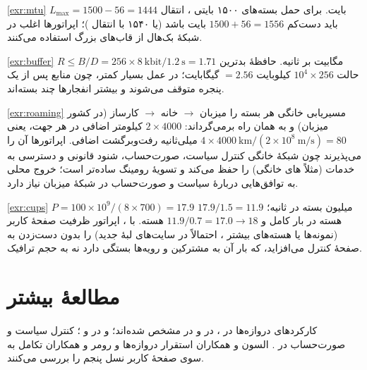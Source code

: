 \documentclass[11pt,a4paper]{article}
\begin{document}
\begin{solutionbox}{\ref{exr:mtu}}
$L_{\max} = 1500 - 56 = 1444$ بایت. برای حمل بسته‌های ۱۵۰۰ بایتی ،  انتقال باید دست‌کم
$1500 + 56 = 1556$ بایت باشد (یا ۱۵۴۰ با انتقال )؛ اپراتورها اغلب در شبکهٔ بک‌هال از قاب‌های بزرگ استفاده
می‌کنند.
\end{solutionbox}

\begin{solutionbox}{\ref{exr:buffer}}
$R \le B/D = 256\times8\ \text{kbit}/1.2\ \text{s} = 1.71$ مگابیت بر ثانیه. حافظهٔ بدترین حالت $10^4\times256$ کیلوبایت
$= 2.56$ گیگابایت؛ در عمل بسیار کمتر، چون منابع  پس از یک پنجره متوقف می‌شوند و بیشتر انفجارها چند بسته‌اند.
\end{solutionbox}

\begin{solutionbox}{\ref{exr:roaming}}
مسیریابی خانگی هر بسته را میزبان $\to$ خانه $\to$ کارساز (در کشور میزبان) و به همان راه برمی‌گرداند: $2\times4000$ کیلومتر
اضافی در هر جهت، یعنی $4\times4000\ \text{km}/(2\times10^8\ \text{m/s}) = 80$ میلی‌ثانیه رفت‌وبرگشت اضافی. اپراتورها آن را
می‌پذیرند چون شبکهٔ خانگی کنترل سیاست، صورت‌حساب، شنود قانونی و دسترسی به خدمات (مثلاً های خانگی) را حفظ
می‌کند و تسویهٔ رومینگ ساده‌تر است؛ خروج محلی به توافق‌هایی دربارهٔ سیاست و صورت‌حساب در شبکهٔ میزبان نیاز دارد.
\end{solutionbox}

\begin{solutionbox}{\ref{exr:cups}}
$P = 100\times10^9/(8\times700) = 17.9$ میلیون بسته در ثانیه؛ $17.9/1.5 = 11.9$ هسته در بار کامل و $11.9/0.7 = 17.0 \to 18$
هسته. با ، اپراتور ظرفیت صفحهٔ کاربر (نمونه‌ها یا هسته‌های بیشتر ، احتمالاً در سایت‌های لبهٔ جدید) را
بدون دست‌زدن به صفحهٔ کنترل می‌افزاید، که بار آن به مشترکین و رویه‌ها بستگی دارد نه به حجم ترافیک.
\end{solutionbox}

\section{مطالعهٔ بیشتر}
کارکردهای دروازه‌ها در  \cite{ts23401}،  در  \cite{ts29274} و  در
 \cite{ts29281} مشخص شده‌اند؛  و  در  \cite{ts23214} و 
\cite{ts29244}؛ کنترل سیاست و صورت‌حساب در  \cite{ts23203}. السون و همکاران \cite{olsson2013epc} استقرار
دروازه‌ها و رومر و همکاران \cite{rommer2020core} تکامل به سوی صفحهٔ کاربر نسل پنجم را بررسی می‌کنند.

\begin{latin}
\printbibliography[heading=subbibliography,title={References}]
\end{latin}
\end{document}
